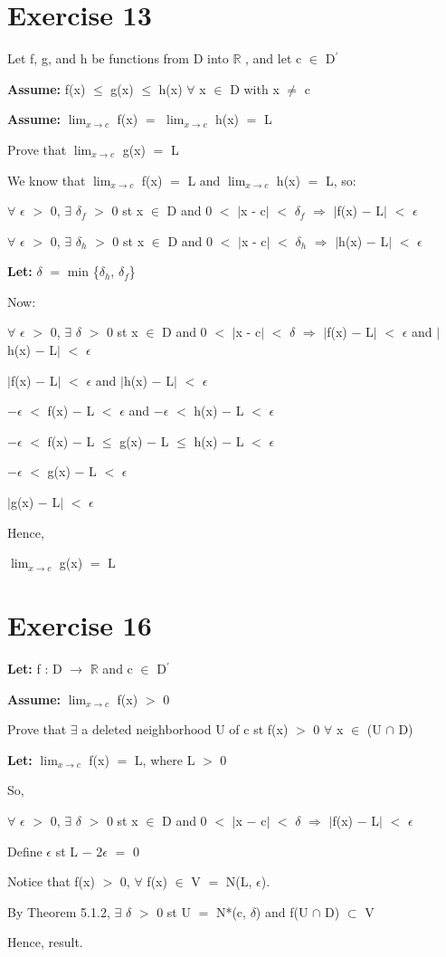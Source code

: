 \documentclass{article}
\newcommand{\mt}[1]{\ensuremath{#1}}
\newcommand\bsc[2][\DefaultOpt]{%
  \def\DefaultOpt{#2}%
  \section[#1]{#2}%
}
\newcommand{\lt}[1]{\textbf{Let: } #1}
\newcommand{\as}[1]{\textbf{Assume: } #1}
\newcommand{\br}{\mt{\mathbb{R}} }       %
\newcommand{\ep}{\mt{\epsilon} }         %
\newcommand{\fa}{\mt{\forall} }          %
\newcommand{\dta}{\mt{\delta} }
\newcommand{\mem}{\mt{\in} }
\newcommand{\exs}{\mt{\exists} }
\newcommand{\sbs}{\mt{\subset} }         %
\newcommand{\lra}{ \mt{\longrightarrow} } %
\newcommand{\rar}{ \mt{\Rightarrow} }     %
\newcommand{\av}[1]{\mt{|}#1\mt{|}}  %
\newcommand{\bk}[1]{\{#1\}}
\newcommand{\ms}{\mt{-} }
\newcommand{\ls}{\mt{<} }
\newcommand{\gr}{\mt{>} }
\newcommand{\lse}{\mt{\leq} }
\newcommand{\eql}{\mt{=} }
\newcommand{\pr}{\mt{^\prime} } 		   %
\newcommand{\limt}[2]{\mt{\displaystyle{\lim_{#1 \to #2}}}}
\newcommand{\inn}{\mt{\cap} }
\begin{document}
\bsc{Exercise 13}{

Let f, g, and h be functions from D into \br, and let c \mem D\pr

\as{f(x) \lse g(x) \lse h(x) \fa x \mem D with x $\neq$ c}

\as{\limt{x}{c} f(x) \eql \limt{x}{c} h(x) \eql L}

Prove that \limt{x}{c} g(x) \eql L

We know that \limt{x}{c} f(x) \eql L and \limt{x}{c} h(x) \eql L, so:

\fa \ep \gr 0, \exs $\delta_f$ \gr 0 st x \mem D and 0 \ls \av{x - c} \ls $\delta_f$ \rar \av{f(x) \ms L} \ls \ep

\fa \ep \gr 0, \exs $\delta_h$  \gr 0 st x \mem D and 0 \ls \av{x - c} \ls $\delta_h$ \rar \av{h(x) \ms L} \ls \ep

\lt{\dta \eql min \bk{$\delta_h$, $\delta_f$}}

Now:

\fa \ep \gr 0, \exs $\delta$  \gr 0 st x \mem D and 0 \ls \av{x - c} \ls $\delta$ \rar \av{f(x) \ms L} \ls \ep and \av{h(x) \ms L} \ls \ep

\av{f(x) \ms L} \ls \ep and \av{h(x) \ms L} \ls \ep

$-\epsilon$ \ls f(x) \ms L \ls $\epsilon$ and $-\epsilon$ \ls h(x) \ms L \ls $\epsilon$

$-\epsilon$ \ls f(x) \ms L \lse g(x) \ms L \lse h(x) \ms L \ls $\epsilon$

$-\epsilon$ \ls g(x) \ms L \ls $\epsilon$

\av{g(x) \ms L} \ls \ep

Hence,

\limt{x}{c} g(x) \eql L





}

\bsc{Exercise 16}{

\lt{f : D \lra \br and c \mem D\pr}

\as{\limt{x}{c} f(x) \gr 0}

Prove that \exs a deleted neighborhood U of c st f(x) \gr 0 \fa x \mem (U \inn D)

\lt{\limt{x}{c} f(x) \eql L, where L \gr 0}

So, 

\fa \ep \gr 0, \exs \dta \gr 0 st x \mem D and 0 \ls \av{x \ms c} \ls \dta \rar \av{f(x) \ms L} \ls \ep

Define \ep st L \ms 2\ep \eql 0

Notice that f(x) \gr 0, \fa f(x) \mem V \eql N(L, $\epsilon$).

By Theorem 5.1.2, \exs \dta \gr 0 st U \eql N*(c, $\delta$) and f(U \inn D) \sbs V

Hence, result.

}
\end{document}
